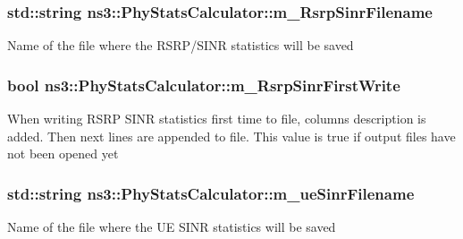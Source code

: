 \subsubsection[{\texorpdfstring{m\+\_\+\+Rsrp\+Sinr\+Filename}{m_RsrpSinrFilename}}]{\setlength{\rightskip}{0pt plus 5cm}std\+::string ns3\+::\+Phy\+Stats\+Calculator\+::m\+\_\+\+Rsrp\+Sinr\+Filename\hspace{0.3cm}{\ttfamily [private]}}\hypertarget{classns3_1_1PhyStatsCalculator_acf3d788baf89a45f2cdd0f186b252a8d}{}\label{classns3_1_1PhyStatsCalculator_acf3d788baf89a45f2cdd0f186b252a8d}
Name of the file where the R\+S\+R\+P/\+S\+I\+NR statistics will be saved 
\subsubsection[{\texorpdfstring{m\+\_\+\+Rsrp\+Sinr\+First\+Write}{m_RsrpSinrFirstWrite}}]{\setlength{\rightskip}{0pt plus 5cm}bool ns3\+::\+Phy\+Stats\+Calculator\+::m\+\_\+\+Rsrp\+Sinr\+First\+Write\hspace{0.3cm}{\ttfamily [private]}}\hypertarget{classns3_1_1PhyStatsCalculator_a46b685dffdee552555c7cfafe4427324}{}\label{classns3_1_1PhyStatsCalculator_a46b685dffdee552555c7cfafe4427324}
When writing R\+S\+RP S\+I\+NR statistics first time to file, columns description is added. Then next lines are appended to file. This value is true if output files have not been opened yet 
\subsubsection[{\texorpdfstring{m\+\_\+ue\+Sinr\+Filename}{m_ueSinrFilename}}]{\setlength{\rightskip}{0pt plus 5cm}std\+::string ns3\+::\+Phy\+Stats\+Calculator\+::m\+\_\+ue\+Sinr\+Filename\hspace{0.3cm}{\ttfamily [private]}}\hypertarget{classns3_1_1PhyStatsCalculator_a5388808a7e5faeb47c716c85ce8183fd}{}\label{classns3_1_1PhyStatsCalculator_a5388808a7e5faeb47c716c85ce8183fd}
Name of the file where the UE S\+I\+NR statistics will be saved 

